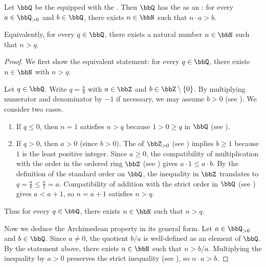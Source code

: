 \begin{proposition} \label{proposition:the_field_of_rational_numbers_is_archimedean}
    Let $\bbQ$ be the  equipped with the . Then $\bbQ$ has the  as an : for every $a \in \bbQ_{>0}$ and $b \in \bbQ$, there exists $n \in \bbN$ such that $n \cdot a > b$.

    Equivalently, for every $q \in \bbQ$, there exists a natural number $n \in \bbN$ such that $n > q$.
\end{proposition}
\begin{proof}
    We first show the equivalent statement: for every $q \in \bbQ$, there exists $n \in \bbN$ with $n > q$.

    Let $q \in \bbQ$. Write $q = \frac{a}{b}$ with $a \in \bbZ$ and $b \in \bbZ \setminus \{0\}$. By multiplying numerator and denominator by $-1$ if necessary, we may assume $b > 0$ (see ). We consider two cases.

    \begin{enumerate}
        \item If $q \le 0$, then $n = 1$ satisfies $n > q$ because $1 > 0 \ge q$ in $\bbQ$ (see ).

        \item If $q > 0$, then $a > 0$ (since $b > 0$). The  of $\bbZ_{>0}$ (see ) implies $b \ge 1$ because $1$ is the least positive integer. Since $a \ge 0$, the compatibility of multiplication with the order in the ordered ring $\bbZ$ (see ) gives $a \cdot 1 \le a \cdot b$. By the definition of the standard order on $\bbQ$, the inequality in $\bbZ$ translates to $q = \frac{a}{b} \le \frac{a}{1} = a$. Compatibility of addition with the strict order in $\bbQ$ (see ) gives $a < a + 1$, so $n = a + 1$ satisfies $n > q$.
    \end{enumerate}

    Thus for every $q \in \bbQ$, there exists $n \in \bbN$ such that $n > q$.

    Now we deduce the Archimedean property in its general form. Let $a \in \bbQ_{>0}$ and $b \in \bbQ$. Since $a \neq 0$, the quotient $b/a$ is well-defined as an element of $\bbQ$. By the statement above, there exists $n \in \bbN$ such that $n > b/a$. Multiplying the inequality by $a > 0$ preserves the strict inequality (see ), so $n \cdot a > b$.
\end{proof}